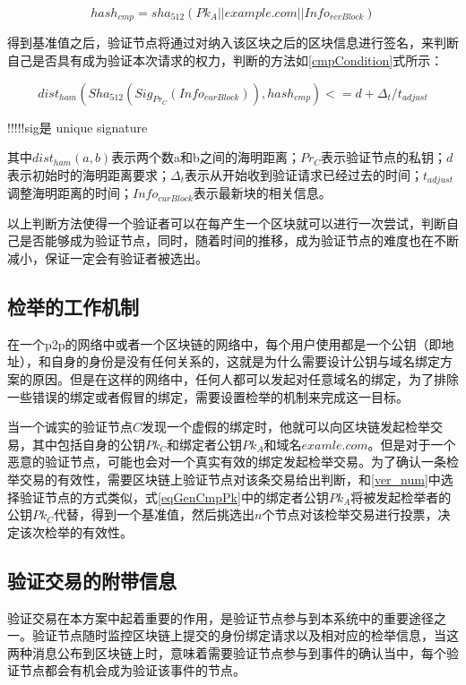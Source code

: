 \begin{equation}\label{eqGenCmpPk}
hash_{cmp} = sha_{512}(Pk_A||example.com||Info_{rcvBlock})
\end{equation}

得到基准值之后，验证节点将通过对纳入该区块之后的区块信息进行签名，来判断自己是否具有成为验证本次请求的权力，判断的方法如\ref{cmpCondition}式所示：


\begin{equation}\label{cmpCondition}
dist_{ham}(Sha_{512}(Sig_{Pr_C}(Info_{curBlock})), hash_{cmp}) <= d + \Delta_t / t_{adjust}
\end{equation}

!!!!!sig是 unique signature

其中$dist_{ham}(a,b)$表示两个数a和b之间的海明距离；$Pr_C$表示验证节点的私钥；$d$表示初始时的海明距离要求；$\Delta_t$表示从开始收到验证请求已经过去的时间；$t_{adjust}$调整海明距离的时间；$Info_{curBlock}$表示最新块的相关信息。

以上判断方法使得一个验证者可以在每产生一个区块就可以进行一次尝试，判断自己是否能够成为验证节点，同时，随着时间的推移，成为验证节点的难度也在不断减小，保证一定会有验证者被选出。



\subsection{检举的工作机制}

在一个p2p的网络中或者一个区块链的网络中，每个用户使用都是一个公钥（即地址），和自身的身份是没有任何关系的，这就是为什么需要设计公钥与域名绑定方案的原因。但是在这样的网络中，任何人都可以发起对任意域名的绑定，为了排除一些错误的绑定或者假冒的绑定，需要设置检举的机制来完成这一目标。

当一个诚实的验证节点$C$发现一个虚假的绑定时，他就可以向区块链发起检举交易，其中包括自身的公钥$Pk_C$和绑定者公钥$Pk_A$和域名$examle.com$。但是对于一个恶意的验证节点，可能也会对一个真实有效的绑定发起检举交易。为了确认一条检举交易的有效性，需要区块链上验证节点对该条交易给出判断，和\ref{ver_num}中选择验证节点的方式类似，式\ref{eqGenCmpPk}中的绑定者公钥$Pk_A$将被发起检举者的公钥$Pk_C$代替，得到一个基准值，然后挑选出$n$个节点对该检举交易进行投票，决定该次检举的有效性。


\subsection{验证交易的附带信息}

验证交易在本方案中起着重要的作用，是验证节点参与到本系统中的重要途径之一。验证节点随时监控区块链上提交的身份绑定请求以及相对应的检举信息，当这两种消息公布到区块链上时，意味着需要验证节点参与到事件的确认当中，每个验证节点都会有机会成为验证该事件的节点。

